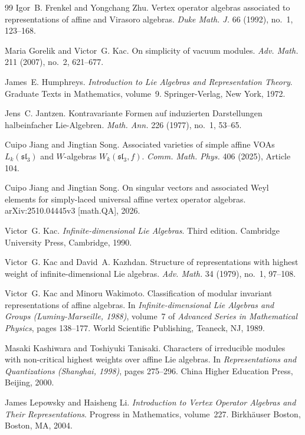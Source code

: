 \documentclass[11pt,a4paper]{amsart}
\theoremstyle{plain}
\numberwithin{equation}{section}
\begin{document}
\begin{thebibliography}{99}
Igor~B. Frenkel and Yongchang Zhu.
\newblock Vertex operator algebras associated to representations of affine and
Virasoro algebras.
\newblock \emph{Duke Math. J.} 66 (1992), no.~1, 123--168.

Maria Gorelik and Victor~G. Kac.
\newblock On simplicity of vacuum modules.
\newblock \emph{Adv. Math.} 211 (2007), no.~2, 621--677.

James~E. Humphreys.
\newblock \emph{Introduction to Lie Algebras and Representation Theory}.
\newblock Graduate Texts in Mathematics, volume~9.
Springer-Verlag, New York, 1972.

Jens~C. Jantzen.
\newblock Kontravariante Formen auf induzierten Darstellungen halbeinfacher
Lie-Algebren.
\newblock \emph{Math. Ann.} 226 (1977), no.~1, 53--65.

Cuipo Jiang and Jingtian Song.
\newblock Associated varieties of simple affine {VOA}s
$L_k(\mathfrak{sl}_3)$ and $W$-algebras
$W_k(\mathfrak{sl}_3,f)$.
\newblock \emph{Comm. Math. Phys.} 406 (2025), Article 104.

Cuipo Jiang and Jingtian Song.
\newblock On singular vectors and associated Weyl elements for simply-laced universal affine vertex operator algebras.
\newblock arXiv:2510.04445v3 [math.QA],  2026.

Victor~G. Kac.
\newblock \emph{Infinite-dimensional Lie Algebras}.
\newblock Third edition. Cambridge University Press, Cambridge, 1990.

Victor~G. Kac and David~A. Kazhdan.
\newblock Structure of representations with highest weight of
infinite-dimensional Lie algebras.
\newblock \emph{Adv. Math.} 34 (1979), no.~1, 97--108.

Victor~G. Kac and Minoru Wakimoto.
\newblock Classification of modular invariant representations of affine
algebras.
\newblock In \emph{Infinite-dimensional Lie Algebras and Groups
	(Luminy-Marseille, 1988)}, volume~7 of
\emph{Advanced Series in Mathematical Physics}, pages 138--177.
World Scientific Publishing, Teaneck, NJ, 1989.

Masaki Kashiwara and Toshiyuki Tanisaki.
\newblock Characters of irreducible modules with non-critical highest weights
over affine Lie algebras.
\newblock In \emph{Representations and Quantizations (Shanghai, 1998)},
pages 275--296.
China Higher Education Press, Beijing, 2000.


James Lepowsky and Haisheng Li.
\newblock \emph{Introduction to Vertex Operator Algebras and Their
	Representations}.
\newblock Progress in Mathematics, volume~227.
Birkh{\"a}user Boston, Boston, MA, 2004.


\end{thebibliography}
\end{document}

